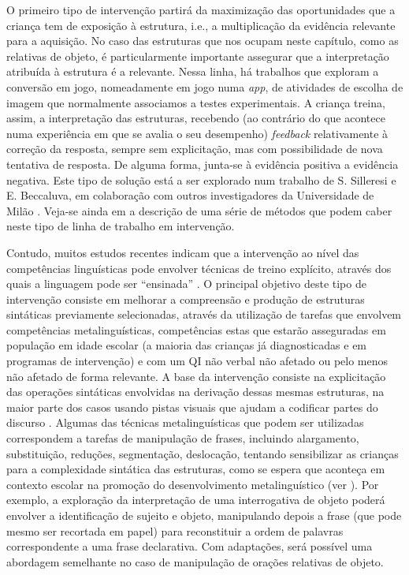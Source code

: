 \documentclass[output=paper,colorlinks,citecolor=brown,booklanguage=portuguese]{langscibook}
\begin{document}
O primeiro tipo de intervenção partirá da maximização das oportunidades que a criança tem de exposição à estrutura, i.e., a multiplicação da evidência relevante para a aquisição. No caso das estruturas que nos ocupam neste capítulo, como as relativas de objeto, é particularmente importante assegurar que a interpretação atribuída à estrutura é a relevante. Nessa linha, há trabalhos que exploram a conversão em jogo, nomeadamente em jogo numa \emph{app}, de atividades de escolha de imagem que normalmente associamos a testes experimentais. A criança treina, assim, a interpretação das estruturas, recebendo (ao contrário do que acontece numa experiência em que se avalia o seu desempenho) \emph{feedback} relativamente à correção da resposta, sempre sem explicitação, mas com possibilidade de nova tentativa de resposta. De alguma forma, junta-se à evidência positiva a evidência negativa. Este tipo de solução está a ser explorado num trabalho de S. Silleresi e E. Beccaluva, em colaboração com outros investigadores da Universidade de Milão \citep{Silleresi2020}. Veja-se ainda em \citet{Ebbels2008} a descrição de uma série de métodos que podem caber neste tipo de linha de trabalho em intervenção.

Contudo, muitos estudos recentes indicam que a intervenção ao nível das competências linguísticas pode envolver técnicas de treino explícito, através dos quais a linguagem pode ser “ensinada” \citep{Law2017}. O principal objetivo deste tipo de intervenção consiste em melhorar a compreensão e produção de estruturas sintáticas previamente selecionadas, através da utilização de tarefas que envolvem competências metalinguísticas, competências estas que estarão asseguradas em população em idade escolar (a maioria das crianças já diagnosticadas e em programas de intervenção) e com um QI não verbal não afetado ou pelo menos não afetado de forma relevante. A base da intervenção consiste na explicitação das operações sintáticas envolvidas na derivação dessas mesmas estruturas, na maior parte dos casos usando pistas visuais que ajudam a codificar partes do discurso \citep{Ebbels2008, Ebbels2014b}. Algumas das técnicas metalinguísticas que podem ser utilizadas correspondem a tarefas de manipulação de frases, incluindo alargamento, substituição, reduções, segmentação, deslocação, tentando sensibilizar as crianças para a complexidade sintática das estruturas, como se espera que aconteça em contexto escolar na promoção do desenvolvimento metalinguístico (ver \citealp{Duarte2008a}). Por exemplo, a exploração da interpretação de uma interrogativa de objeto poderá envolver a identificação de sujeito e objeto, manipulando depois a frase (que pode mesmo ser recortada em papel) para reconstituir a ordem de palavras correspondente a uma frase declarativa. Com adaptações, será possível uma abordagem semelhante no caso de manipulação de orações relativas de objeto.
\end{document}
